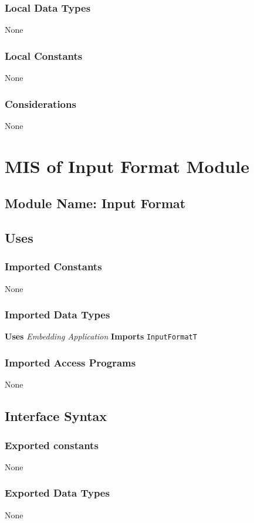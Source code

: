 \documentclass[12pt,titlepage]{article}
\begin{document}
\subsubsection{Local Data Types} None
\subsubsection{Local Constants} None
\subsubsection{Considerations} None


\section{MIS of Input Format Module \label{AmisSecInput}}

\subsection{Module Name: Input Format}

\subsection{Uses}
\subsubsection{Imported Constants} None
\subsubsection{Imported Data Types} 
{\bf Uses}  \emph{Embedding Application}  {\bf Imports}  \texttt{InputFormatT}  

\subsubsection{Imported Access Programs}
None
\subsection{Interface Syntax}
\subsubsection{Exported constants} None
\subsubsection{Exported Data Types}None
\end{document}
